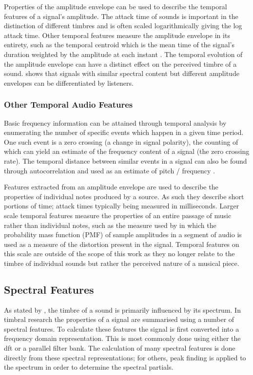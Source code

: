 			Properties of the amplitude envelope can be used to describe the temporal features of a signal's
			amplitude. The attack time of sounds is important in the distinction of different timbres
			\citep{ilmoniemi2004subjective} and is often scaled logarithmically giving the log attack time.
			Other temporal features measure the amplitude envelope in its entirety, such as the temporal
			centroid which is the mean time of the signal's duration weighted by the amplitude at each instant
			\citep{peeters2000instrument}. The temporal evolution of the amplitude envelope can have a distinct
			effect on the perceived timbre of a sound. \citet{patterson1994the} shows that signals with similar
			spectral content but different amplitude envelopes can be differentiated by listeners.

		\subsubsection*{Other Temporal Audio Features}
			Basic frequency information can be attained through temporal analysis by enumerating the number of
			specific events which happen in a given time period. One such event is a zero crossing (a change in
			signal polarity), the counting of which can yield an estimate of the frequency content of a signal
			(the zero crossing rate). The temporal distance between similar events in a signal can also be
			found through autocorrelation and used as an estimate of pitch / frequency \citep{mcleod2005a}.

			Features extracted from an amplitude envelope are used to describe the properties of individual
			notes produced by a source. As such they describe short portions of time; attack times typically
			being measured in milliseconds. Larger scale temporal features measure the properties of an entire
			passage of music rather than individual notes, such as the measure used by
			\citet{wilson2014profiling} in which the probability mass function (PMF) of sample amplitudes in a
			segment of audio is used as a measure of the distortion present in the signal.  Temporal features
			on this scale are outside of the scope of this work as they no longer relate to the timbre of
			individual sounds but rather the perceived nature of a musical piece.

	\subsection{Spectral Features}
	\label{sec:Timbre-LowLevelFeatures-Spectral}
		As stated by \cite{ASA1960american}, the timbre of a sound is primarily influenced by its spectrum. In
		timbral research the properties of a signal are summarised using a number of spectral features. To
		calculate these features the signal is first converted into a frequency domain representation. This is most
		commonly done using either the \acrfull{dft} or a parallel filter bank. The calculation of many spectral
		features is done directly from these spectral representations; for others, peak finding is applied to the
		spectrum in order to determine the spectral partials.

